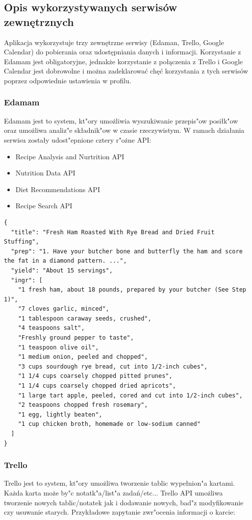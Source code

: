 \documentclass{article}
\begin{document}
\subsection{Opis wykorzystywanych serwisów zewnętrznych}

	Aplikacja wykorzystuje trzy zewnętrzne serwisy (Edaman, Trello, Google Calendar) do pobierania oraz udostępniania danych i informacji. Korzystanie z Edamam jest obligatoryjne, jednakże korzystanie z połączenia z Trello i Google Calendar jest dobrowolne i można zadeklarować chęć korzystania z tych serwisów poprzez odpowiednie ustawienia w profilu.

\subsubsection{Edamam}
	Edamam jest to system, kt"ory umo\.zliwia wyszukiwanie przepis"ow posiłk"ow oraz umo\.zliwa analiz"e składnik"ow w czasie rzeczywistym. W ramach działania serwisu zostały udost"epnione cztery r"o\.zne API:
	\begin{itemize}
		\item Recipe Analysis and Nurtrition API
		\item Nutrition Data API
		\item Diet Recommendations API
		\item Recipe Search API
	\end{itemize}
	
	\begin{lstlisting}[label=edaman,caption=Edaman API Example,breaklines=true]
{
  "title": "Fresh Ham Roasted With Rye Bread and Dried Fruit Stuffing",
  "prep": "1. Have your butcher bone and butterfly the ham and score the fat in a diamond pattern. ...",
  "yield": "About 15 servings",
  "ingr": [
    "1 fresh ham, about 18 pounds, prepared by your butcher (See Step 1)",
    "7 cloves garlic, minced",
    "1 tablespoon caraway seeds, crushed",
    "4 teaspoons salt",
    "Freshly ground pepper to taste",
    "1 teaspoon olive oil",
    "1 medium onion, peeled and chopped",
    "3 cups sourdough rye bread, cut into 1/2-inch cubes",
    "1 1/4 cups coarsely chopped pitted prunes",
    "1 1/4 cups coarsely chopped dried apricots",
    "1 large tart apple, peeled, cored and cut into 1/2-inch cubes",
    "2 teaspoons chopped fresh rosemary",
    "1 egg, lightly beaten",
    "1 cup chicken broth, homemade or low-sodium canned"
  ]
}
	\end{lstlisting}

\subsubsection{Trello}
	Trello jest to system, kt"ory umo\.zliwa tworzenie tablic wypełnion"a kartami. Ka\.zda karta mo\.ze by"c notatk"a/list"a zadań/etc... Trello API umo\.zliwa tworzenie nowych tablic/notatek jak i dodawanie nowych, bad"z modyfikowanie czy usuwanie starych. Przykładowe zapytanie zwr"ocenia informacji o karcie:
\end{document}

